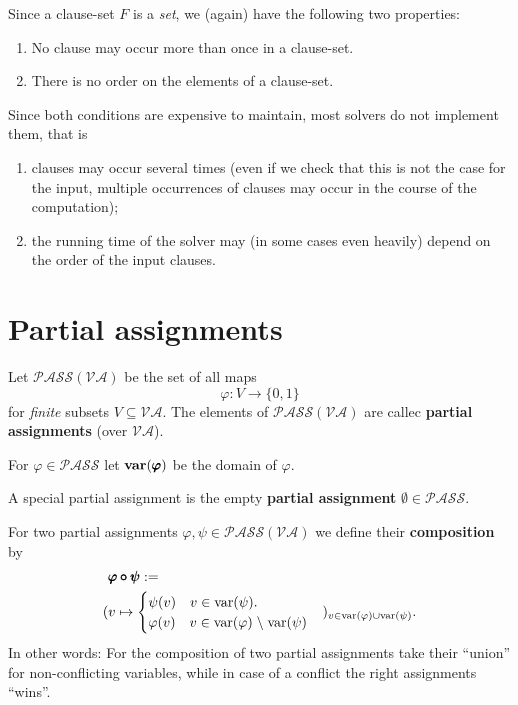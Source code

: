 \documentclass{article}
\def\mva{{\mathcal{VA}}}
\def\mpass{{\mathcal{PASS}}}
\def\mpv{{\mpass(\mva)}}
\def\pmpv{{\pmb{\mpass(\mva)}}}
\def\var{{\rm var}}
\def\bvar{{\bf var}}
\def\q{{\quad}}
\begin{document}
Since a clause-set $F$ is a \textit{set}, we (again) have the following two properties:
\begin{enumerate}
\item No clause may occur more than once in a clause-set.
\item There is no order on the elements of a clause-set.
\end{enumerate}
Since both conditions are expensive to maintain, most solvers do not implement them, that is
\begin{enumerate}
\item clauses may occur several times  (even if we check that this is not the case for the input, multiple occurrences of clauses may occur in the course of the computation);
\item the running time of the solver may (in some cases even heavily) depend on the order of the input clauses.
\end{enumerate}


\section{Partial assignments}%

Let $\pmpv$ be the set of all maps
\[
\varphi : V \to \{ 0, 1 \}
\]
for \textit{finite} subsets $V\subseteq \mva$. The elements of $\mpv$ are callec \textbf{partial assignments} (over $\mva$).

For $\varphi \in \mpass$ let $\bvar(\pmb{\varphi})$ be the domain of $\varphi$.

A special partial assignment is the empty \textbf{partial assignment} $\emptyset \in \mpass$.

For two partial assignments $\varphi,\psi \in \mpv$ we define their \textbf{composition} by
\begin{align*}
& \pmb{\varphi \circ \psi} := \\
 (
& v\mapsto
\begin{cases}
\psi(v) \q v \in \var(\psi). \\
\varphi(v) \q v \in \var(\varphi) \; \backslash \; \var(\psi)
\end{cases}
)_{v\in \var(\varphi) \cup \var(\psi)}.
\end{align*}
In other words: For the composition of two partial assignments take their ``union'' for non-conflicting variables, while in case of a conflict the right assignments ``wins''.
\end{document}
